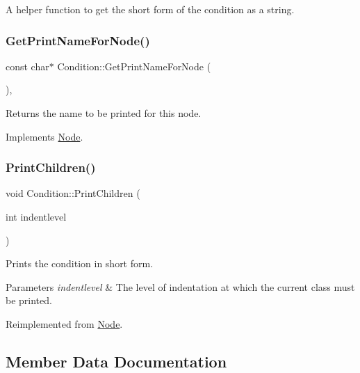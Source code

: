 A helper function to get the short form of the condition as a string. \mbox{\label{class_condition_aafdb69783f81fa13cfdc8896bbd34095}} 
\subsubsection{\texorpdfstring{Get\+Print\+Name\+For\+Node()}{GetPrintNameForNode()}}
{\footnotesize\ttfamily const char$\ast$ Condition\+::\+Get\+Print\+Name\+For\+Node (\begin{DoxyParamCaption}{ }\end{DoxyParamCaption})\hspace{0.3cm}{\ttfamily [inline]}, {\ttfamily [virtual]}}

Returns the name to be printed for this node. 

Implements \hyperlink{class_node_a56e29657306ffb004d69c6929ae44269}{Node}.

\mbox{\label{class_condition_abdf41362b3b1f8a2fdeb290d657928a2}} 
\subsubsection{\texorpdfstring{Print\+Children()}{PrintChildren()}}
{\footnotesize\ttfamily void Condition\+::\+Print\+Children (\begin{DoxyParamCaption}\item[{int}]{indentlevel }\end{DoxyParamCaption})\hspace{0.3cm}{\ttfamily [virtual]}}

Prints the condition in short form. 
\begin{DoxyParams}{Parameters}
{\em indentlevel} & The level of indentation at which the current class must be printed. \\
\hline
\end{DoxyParams}


Reimplemented from \hyperlink{class_node_a3e67ec8d22182b721717af14fe0c3000}{Node}.



\subsection{Member Data Documentation}
\mbox{\label{class_condition_ac943c2c4b15adc82cb31b9f02c61b8a3}} 
